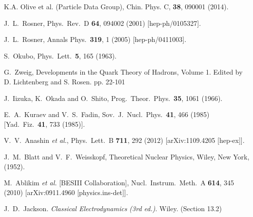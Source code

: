 \begin{thebibliography}{99}



  K.A. Olive et al. (Particle Data Group),
  Chin. Phys. C, {\bf 38}, 090001 (2014).

  J.~L.~Rosner,
  Phys.\ Rev.\ D {\bf 64}, 094002 (2001)
  [hep-ph/0105327].

  J.~L.~Rosner,
  Annals Phys.\  {\bf 319}, 1 (2005)
  [hep-ph/0411003].

  S.~Okubo,
  Phys.\ Lett.\  {\bf 5}, 165 (1963).

  G.~Zweig,
  Developments in the Quark Theory of Hadrons, Volume 1. Edited by D. Lichtenberg and S. Rosen. pp. 22-101

  J.~Iizuka, K.~Okada and O.~Shito,
  Prog.\ Theor.\ Phys.\  {\bf 35}, 1061 (1966).

  E.~A.~Kuraev and V.~S.~Fadin,
  Sov.\ J.\ Nucl.\ Phys.\  {\bf 41}, 466 (1985)
  [Yad.\ Fiz.\  {\bf 41}, 733 (1985)].

  V.~V.~Anashin {\it et al.},
  Phys.\ Lett.\ B {\bf 711}, 292 (2012)
  [arXiv:1109.4205 [hep-ex]].

  J.~M.~Blatt and V.~F.~Weisskopf,
  Theoretical Nuclear Physics, Wiley, New York, (1952).



  M.~Ablikim {\it et al.}  [BESIII Collaboration],
  Nucl.\ Instrum.\ Meth.\ A {\bf 614}, 345 (2010)
  [arXiv:0911.4960 [physics.ins-det]].

  J.~D.~Jackson.
  {\it Classical Electrodynamics (3rd ed.)}.
  Wiley. (Section 13.2)
 

\end{thebibliography}
